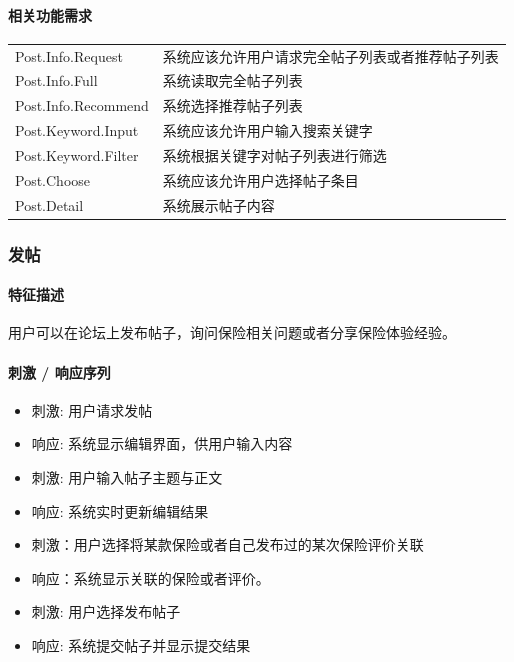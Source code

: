 \documentclass[a4paper]{ctexart}
\begin{document}
\paragraph{相关功能需求}

\begin{center}
    \begin{tabular}{p{6cm}|p{8cm}}
      \toprule
      Post.Info.Request & 系统应该允许用户请求完全帖子列表或者推荐帖子列表 \\
      Post.Info.Full & 系统读取完全帖子列表      \\
      Post.Info.Recommend & 系统选择推荐帖子列表 \\
      \midrule
      Post.Keyword.Input & 系统应该允许用户输入搜索关键字\\
      Post.Keyword.Filter & 系统根据关键字对帖子列表进行筛选 \\
      \midrule
      Post.Choose & 系统应该允许用户选择帖子条目 \\
      Post.Detail & 系统展示帖子内容 \\
      \bottomrule
    \end{tabular}
\end{center}

\subsubsection{发帖}

\paragraph{特征描述}
用户可以在论坛上发布帖子，询问保险相关问题或者分享保险体验经验。

\paragraph{刺激 / 响应序列}

\begin{itemize}
  \item 刺激: 用户请求发帖
  \item 响应: 系统显示编辑界面，供用户输入内容
  \item 刺激: 用户输入帖子主题与正文
  \item 响应: 系统实时更新编辑结果
  \item 刺激：用户选择将某款保险或者自己发布过的某次保险评价关联
  \item 响应：系统显示关联的保险或者评价。
  \item 刺激: 用户选择发布帖子
  \item 响应: 系统提交帖子并显示提交结果
\end{itemize}
\end{document}
